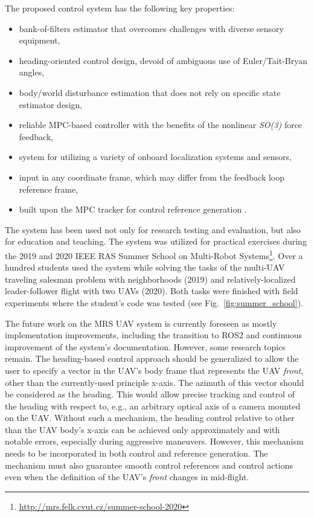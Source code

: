 \documentclass[a4paper,11pt,twoside,openright]{book}
\newcommand{\reffig}[1]{Fig.~\ref{#1}}
\begin{document}
\noindent
The proposed control system has the following key properties:
\begin{itemize}
  \item bank-of-filters estimator that overcomes challenges with diverse sensory equipment,
  \item heading-oriented control design, devoid of ambiguous use of Euler/Tait-Bryan angles,
  \item body/world disturbance estimation that does not rely on specific state estimator design,
  \item reliable MPC-based controller with the benefits of the nonlinear \emph{SO(3)} force feedback,
  \item system for utilizing a variety of onboard localization systems and sensors,
  \item input in any coordinate frame, which may differ from the feedback loop reference frame,
  \item built upon the \ac{MPC} tracker for control reference generation \cite{baca2018model}.
\end{itemize}

The system has been used not only for research testing and evaluation, but also for education and teaching.
The system was utilized for practical exercises during the 2019 and 2020 \acs{IEEE} \acs{RAS} Summer School on Multi-Robot Systems\footnote{\url{http://mrs.felk.cvut.cz/summer-school-2020}}.
Over a hundred students used the system while solving the tasks of the multi-\ac{UAV} traveling salesman problem with neighborhoods (2019) and relatively-localized leader-follower flight with two \acp{UAV} (2020).
Both tasks were finished with field experiments where the student's code was tested (see \reffig{fig:summer_school}).

The future work on the MRS UAV system is currently foreseen as mostly implementation improvements, including the transition to \acs{ROS}2 and continuous improvement of the system's documentation.
However, some research topics remain.
The heading-based control approach should be generalized to allow the user to specify a vector in the \ac{UAV}'s body frame that represents the \ac{UAV} \emph{front}, other than the currently-used principle x-axis.
The azimuth of this vector should be considered as the heading.
This would allow precise tracking and control of the heading with respect to, e.g., an arbitrary optical axis of a camera mounted on the \ac{UAV}.
Without such a mechanism, the heading control relative to other than the \ac{UAV} body's x-axis can be achieved only approximately and with notable errors, especially during aggressive maneuvers.
However, this mechanism needs to be incorporated in both control and reference generation.
The mechanism must also guarantee smooth control references and control actions even when the definition of the \ac{UAV}'s \emph{front} changes in mid-flight.
\end{document}
